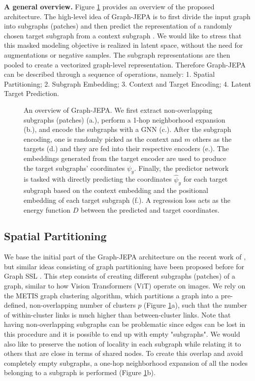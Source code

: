 \documentclass{article} \usepackage{iclr2024_conference,times}
\begin{document}
\textbf{A general overview.} Figure \ref{fig:graphjepa-diagram} provides an overview of the proposed architecture. The high-level idea of Graph-JEPA is to first divide the input graph into subgraphs (patches) \citep{he2023generalization} and then predict the representation of a randomly chosen target subgraph from a context subgraph \citep{assran2023self}. We would like to stress that this masked modeling objective is realized in latent space, without the need for augmentations or negative samples. The subgraph representations are then pooled to create a vectorized graph-level representation. Therefore Graph-JEPA can be described through a sequence of operations, namely: 1. Spatial Partitioning; 2. Subgraph Embedding; 3. Context and Target Encoding; 4. Latent Target Prediction.

\begin{figure}
    \centering
    \caption{An overview of Graph-JEPA. We first extract non-overlapping subgraphs (patches) (a.), perform a 1-hop neighborhood expansion (b.), and encode the subgraphs with a GNN (c.). After the subgraph encoding, one is randomly picked as the context and $m$ others as the targets (d.) and they are fed into their respective encoders (e.). The embeddings generated from the target encoder are used to produce the target subgraphs' coordinates $\psi_y$. Finally, the predictor network is tasked with directly predicting the coordinates $\hat{\psi}_y$ for each target subgraph based on the context embedding and the positional embedding of each target subgraph (f.). A regression loss acts as the energy function $D$ between the predicted and target coordinates.} 
    \label{fig:graphjepa-diagram}
\end{figure}


\subsection{Spatial Partitioning} \label{met:partitioning}
We base the initial part of the Graph-JEPA architecture on the recent work of \citet{he2023generalization}, but similar ideas consisting of graph partitioning have been proposed before for Graph SSL \citep{jin2020self}. This step consists of creating different subgraphs (patches) of a graph, similar to how Vision Transformers (ViT) \citep{dosovitskiy2020image} operate on images. We rely on the METIS \citep{karypis1998fast} graph clustering algorithm, which partitions a graph into a pre-defined, non-overlapping number of clusters $p$ (Figure \ref{fig:graphjepa-diagram}a), such that the number of within-cluster links is much higher than between-cluster links. Note that having non-overlapping subgraphs can be problematic since edges can be lost in this procedure and it is possible to end up with empty "subgraphs". We would also like to preserve the notion of locality in each subgraph while relating it to others that are close in terms of shared nodes. To create this overlap and avoid completely empty subgraphs, a one-hop neighborhood expansion of all the nodes belonging to a subgraph is performed (Figure \ref{fig:graphjepa-diagram}b).
\end{document}
